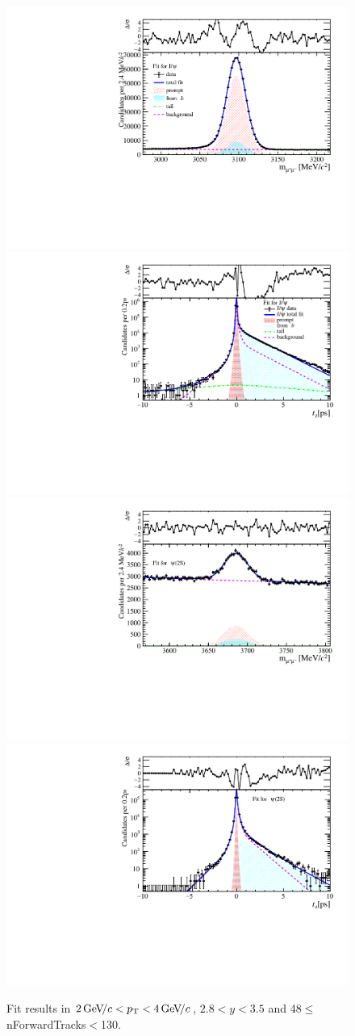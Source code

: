 \begin{figure}[H]
\begin{center}
\includegraphics[width=0.47\linewidth]{pdf/Jpsi/drawmassF/n5y2pt2.pdf}
\includegraphics[width=0.47\linewidth]{pdf/Jpsi/2DFitF/n5y2pt2.pdf}
\vspace*{-0.5cm}
\includegraphics[width=0.47\linewidth]{pdf/Psi2S/drawmassF/n5y2pt2.pdf}
\includegraphics[width=0.47\linewidth]{pdf/Psi2S/2DFitF/n5y2pt2.pdf}
\vspace*{-0.5cm}
\end{center}
\caption{Fit results in $2\text{\,Ge\kern -0.1em V\!/}c<p_{\mathrm{T}}<4\text{\,Ge\kern -0.1em V\!/}c$, $2.8<y<3.5$ and 48$\leq$nForwardTracks$<$130.}
\label{Fitn5y2pt2}
\end{figure}
